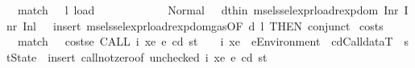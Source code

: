 \begin{isabellebody}
\ \ match\ \ \ l{\isacharcolon}{\kern0pt}\ {\isachardoublequoteopen}load\ {\isacharunderscore}{\kern0pt}\ {\isacharunderscore}{\kern0pt}\ {\isacharunderscore}{\kern0pt}\ {\isacharunderscore}{\kern0pt}\ {\isacharunderscore}{\kern0pt}\ {\isacharunderscore}{\kern0pt}\ {\isacharunderscore}{\kern0pt}\ {\isacharunderscore}{\kern0pt}\ {\isacharunderscore}{\kern0pt}\ {\isacharunderscore}{\kern0pt}\ {\isacharunderscore}{\kern0pt}\ {\isacharequal}{\kern0pt}\ Normal\ {\isacharparenleft}{\kern0pt}{\isacharunderscore}{\kern0pt}{\isacharcomma}{\kern0pt}{\isacharunderscore}{\kern0pt}{\isacharparenright}{\kern0pt}{\isachardoublequoteclose}\ \ d{\isacharbrackleft}{\kern0pt}thin{\isacharbrackright}{\kern0pt}{\isacharcolon}{\kern0pt}\ {\isachardoublequoteopen}msel{\isacharunderscore}{\kern0pt}ssel{\isacharunderscore}{\kern0pt}expr{\isacharunderscore}{\kern0pt}load{\isacharunderscore}{\kern0pt}rexp{\isacharunderscore}{\kern0pt}dom\ {\isacharparenleft}{\kern0pt}Inr\ {\isacharparenleft}{\kern0pt}Inr\ {\isacharparenleft}{\kern0pt}Inl\ {\isacharunderscore}{\kern0pt}{\isacharparenright}{\kern0pt}{\isacharparenright}{\kern0pt}{\isacharparenright}{\kern0pt}{\isachardoublequoteclose}\ {\isasymRightarrow}\ {\isacartoucheopen}insert\ msel{\isacharunderscore}{\kern0pt}ssel{\isacharunderscore}{\kern0pt}expr{\isacharunderscore}{\kern0pt}load{\isacharunderscore}{\kern0pt}rexp{\isacharunderscore}{\kern0pt}dom{\isacharunderscore}{\kern0pt}gas{\isacharparenleft}{\kern0pt}{}{\isacharparenright}{\kern0pt}{\isacharbrackleft}{\kern0pt}OF\ d\ l{\isacharcomma}{\kern0pt}\ THEN\ conjunct{}{\isacharbrackright}{\kern0pt}{\isacartoucheclose}\isanewline
\isanewline
{}\isamarkupfalse%
\ costs\ {\isacharequal}{\kern0pt}\isanewline
\ \ match\ \ \ {\isachardoublequoteopen}costs\isactrlsub e\ {\isacharparenleft}{\kern0pt}CALL\ i\ xe{\isacharparenright}{\kern0pt}\ e\ cd\ st\ {\isacharless}{\kern0pt}\ {\isacharunderscore}{\kern0pt}{\isachardoublequoteclose}\ \ i\ xe\ \ e{\isacharcolon}{\kern0pt}{\isacharcolon}{\kern0pt}Environment\ \ cd{\isacharcolon}{\kern0pt}{\isacharcolon}{\kern0pt}CalldataT\ \ st{\isacharcolon}{\kern0pt}{\isacharcolon}{\kern0pt}State\ {\isasymRightarrow}\ {\isacartoucheopen}insert\ call{\isacharunderscore}{\kern0pt}not{\isacharunderscore}{\kern0pt}zero{\isacharbrackleft}{\kern0pt}of\ {\isacharparenleft}{\kern0pt}unchecked{\isacharparenright}{\kern0pt}\ i\ xe\ e\ cd\ st{\isacharbrackright}{\kern0pt}{\isacartoucheclose}\ {\isacharbar}{\kern0pt}\isanewline

\end{isabellebody}
